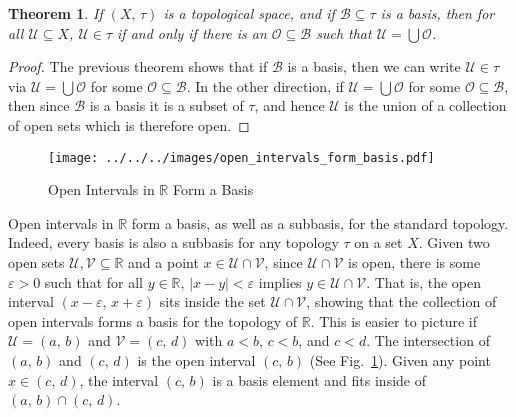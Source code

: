 \documentclass{article}
\theoremstyle{plain}
\newtheorem{theorem}{Theorem}[section]
\theoremstyle{normal}
\newenvironment{example}{%
    \pushQED{\qed}\renewcommand{\qedsymbol}{$\blacksquare$}\examplex%
}{%
    \popQED\endexamplex%
}
\begin{document}
        \begin{theorem}
            If $(X,\,\tau)$ is a topological space, and if
            $\mathcal{B}\subseteq\tau$ is a basis, then for all
            $\mathcal{U}\subseteq{X}$, $\mathcal{U}\in\tau$ if and only if
            there is an $\mathcal{O}\subseteq\mathcal{B}$ such that
            $\mathcal{U}=\bigcup\mathcal{O}$.
        \end{theorem}
        \begin{proof}
            The previous theorem shows that if $\mathcal{B}$ is a basis, then
            we can write $\mathcal{U}\in\tau$ via
            $\mathcal{U}=\bigcup\mathcal{O}$ for some
            $\mathcal{O}\subseteq\mathcal{B}$. In the other direction, if
            $\mathcal{U}=\bigcup\mathcal{O}$ for some
            $\mathcal{O}\subseteq\mathcal{B}$, then since $\mathcal{B}$ is a
            basis it is a subset of $\tau$, and hence $\mathcal{U}$ is the
            union of a collection of open sets which is therefore open.
        \end{proof}
        \begin{figure}
            \centering
            \texttt{[image: ../../../images/open\_intervals\_form\_basis.pdf]}
            \caption{Open Intervals in $\mathbb{R}$ Form a Basis}
            \label{fig:open_intervals_form_basis}
        \end{figure}
        \begin{example}
            Open intervals in $\mathbb{R}$ form a basis, as well as a subbasis,
            for the standard topology. Indeed, every basis is also a subbasis
            for any topology $\tau$ on a set $X$.
            Given two open sets $\mathcal{U},\mathcal{V}\subseteq\mathbb{R}$
            and a point $x\in\mathcal{U}\cap\mathcal{V}$, since
            $\mathcal{U}\cap\mathcal{V}$ is open, there is some
            $\varepsilon>0$ such that for all $y\in\mathbb{R}$,
            $|x-y|<\varepsilon$ implies $y\in\mathcal{U}\cap\mathcal{V}$. That
            is, the open interval $(x-\varepsilon,\,x+\varepsilon)$ sits inside
            the set $\mathcal{U}\cap\mathcal{V}$, showing that the collection
            of open intervals forms a basis for the topology of $\mathbb{R}$.
            This is easier to picture if $\mathcal{U}=(a,\,b)$ and
            $\mathcal{V}=(c,\,d)$ with $a<b$, $c<b$, and $c<d$. The
            intersection of $(a,\,b)$ and $(c,\,d)$ is the open interval
            $(c,\,b)$ (See Fig.~\ref{fig:open_intervals_form_basis}). Given
            any point $x\in(c,\,d)$, the interval $(c,\,b)$ is a basis element
            and fits inside of $(a,\,b)\cap(c,\,d)$.
        \end{example}
\end{document}
